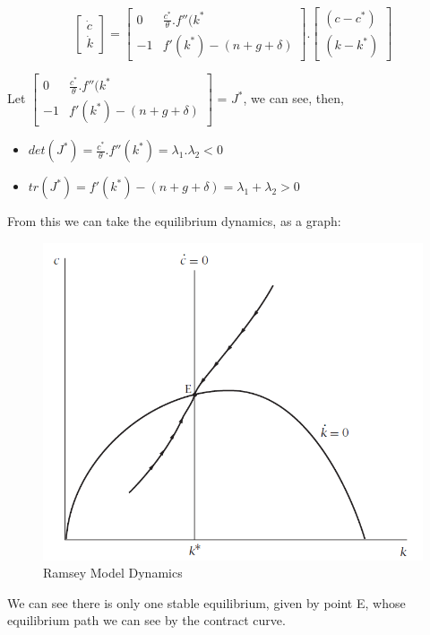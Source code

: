 $$    
\begin{bmatrix}
    \dot{c} \\ 
    \dot{k}
\end{bmatrix}
=
\begin{bmatrix}
    0 &  \frac{c^{*}}{\theta}.f''(k^{*}\\
    -1 & f'(k^{*})-(n+g+ \delta)
\end{bmatrix}
.
\begin{bmatrix}
    (c-c^{*}) \\
    (k-k^{*})
\end{bmatrix}
$$

Let 
$
\begin{bmatrix}
    0 &  \frac{c^{*}}{\theta}.f''(k^{*}\\
    -1 & f'(k^{*})-(n+g+ \delta)
\end{bmatrix}$
= $J^{*}$, we can see, then, 

\begin{itemize}
    \item $det(J^{*})=\frac{c^{*}}{\theta}.f''(k^{*})= \lambda_{1}.\lambda_{2} <0$
    \item $tr(J^{*})=f'(k^{*})-(n+g+\delta)=\lambda_{1}+\lambda_{2} >0$
\end{itemize}

From this we can take the equilibrium dynamics, as a graph: 

\begin{figure}[H]
    \centering
    \includegraphics[width=.7\textwidth]{Ramsey.PNG}
    \caption{Ramsey Model Dynamics}
    \label{fig:my_label}
\end{figure}

We can see there is only one stable equilibrium, given by point E, whose equilibrium path we can see by the contract curve. 

